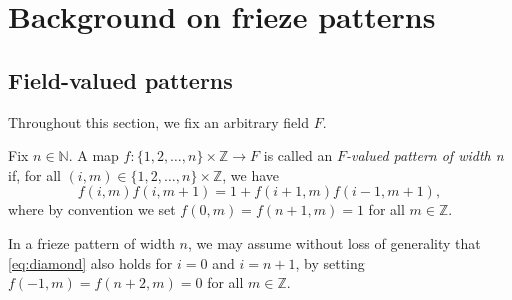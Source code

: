 \chapter{Background on frieze patterns}\label{s:fp}
\section{Field-valued patterns}
Throughout this section, we fix an arbitrary field $F$. 


\begin{definition}
    \label{def:pattern_n}
        Fix $n \in \mathbb{N}$. A map $f : \{1,2,\ldots , n\} \times \mathbb{Z} \longrightarrow F$ is called
        an \textit{$F$-valued pattern of width n} if, for all $(i,m) \in \{1,2,\ldots , n\} \times \mathbb{Z}$, we have
        \begin{equation}\label{eq:diamond}
            f(i,m) f(i,m+1) = 1 + f(i+1,m) f(i-1, m+1),
        \end{equation}
        where by convention we set $f(0,m) = f(n+1,m) = 1$ for all $m \in \mathbb{Z}$. 
    \end{definition}
    In a frieze pattern of width $n$, we may assume without loss of generality that \eqref{eq:diamond} also holds for 
    $i=0$ and $i = n+1$, by setting $f(-1,m) = f(n+2,m) = 0$ for all $m \in \mathbb{Z}$. 

